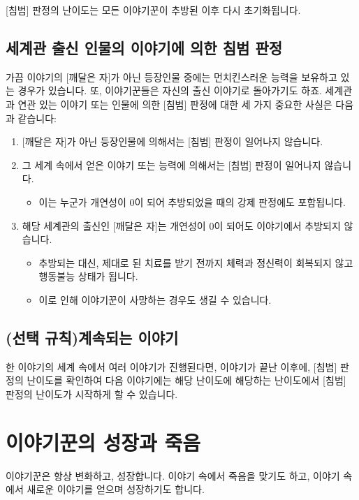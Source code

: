 \documentclass[12pt]{report}
\begin{document}
	[침범] 판정의 난이도는 모든 이야기꾼이 추방된 이후 다시 초기화됩니다.
	
	\section*{세계관 출신 인물의 이야기에 의한 침범 판정}
	가끔 이야기의 [깨달은 자]가 아닌 등장인물 중에는 먼치킨스러운 능력을 보유하고 있는 경우가 있습니다. 또, 이야기꾼들은 자신의 출신 이야기로 돌아가기도 하죠. 세계관과 연관 있는 이야기 또는 인물에 의한 [침범] 판정에 대한 세 가지 중요한 사실은 다음과 같습니다:
	\begin{enumerate}
		\item {}[깨달은 자]가 아닌 등장인물에 의해서는 [침범] 판정이 일어나지 않습니다.
		\item 그 세계 속에서 얻은 이야기 또는 능력에 의해서는 [침범] 판정이 일어나지 않습니다.
		\begin{itemize}
			\item 이는 누군가 개연성이 0이 되어 추방되었을 때의 강제 판정에도 포함됩니다.
		\end{itemize}
		\item 해당 세계관의 출신인 [깨달은 자]는 개연성이 0이 되어도 이야기에서 추방되지 않습니다.
		\begin{itemize}
			\item 추방되는 대신, 제대로 된 치료를 받기 전까지 체력과 정신력이 회복되지 않고 행동불능 상태가 됩니다.
			\item 이로 인해 이야기꾼이 사망하는 경우도 생길 수 있습니다.
		\end{itemize}
	\end{enumerate}
	
	\section*{(선택 규칙)계속되는 이야기}
	한 이야기의 세계 속에서 여러 이야기가 진행된다면, 이야기가 끝난 이후에, [침범] 판정의 난이도를 확인하여 다음 이야기에는 해당 난이도에 해당하는 난이도에서 [침범] 판정의 난이도가 시작하게 할 수 있습니다.
	
	\chapter{이야기꾼의 성장과 죽음}\label{성장}
	이야기꾼은 항상 변화하고, 성장합니다. 이야기 속에서 죽음을 맞기도 하고, 이야기 속에서 새로운 이야기를 얻으며 성장하기도 합니다.
	
\end{document}
